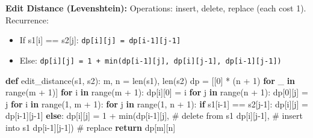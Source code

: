\documentclass[11pt]{article}
\providecommand{\tightlist}{\setlength{\itemsep}{1pt}\setlength{\parskip}{0pt}}
\newenvironment{Shaded}{\begin{snugshade}}{\end{snugshade}}
\newcommand{\BuiltInTok}[1]{\textcolor[rgb]{0.50,0.55,0.55}{#1}}
\newcommand{\CommentTok}[1]{\textcolor[rgb]{0.48,0.49,0.49}{#1}}
\newcommand{\ControlFlowTok}[1]{\textcolor[rgb]{0.99,0.74,0.29}{\textbf{#1}}}
\newcommand{\DecValTok}[1]{\textcolor[rgb]{0.96,0.45,0.00}{#1}}
\newcommand{\KeywordTok}[1]{\textcolor[rgb]{0.81,0.81,0.76}{\textbf{#1}}}
\newcommand{\NormalTok}[1]{\textcolor[rgb]{0.81,0.81,0.76}{#1}}
\newcommand{\OperatorTok}[1]{\textcolor[rgb]{0.81,0.81,0.76}{#1}}
\begin{document}
\textbf{Edit Distance (Levenshtein):}
Operations: insert, delete, replace (each cost 1).
Recurrence:

\begin{itemize}
\tightlist
\item
  If s1{[}i{]} == s2{[}j{]}: \texttt{dp{[}i{]}{[}j{]}\ =\ dp{[}i-1{]}{[}j-1{]}}
\item
  Else: \texttt{dp{[}i{]}{[}j{]}\ =\ 1\ +\ min(dp{[}i-1{]}{[}j{]},\ dp{[}i{]}{[}j-1{]},\ dp{[}i-1{]}{[}j-1{]})}
\end{itemize}


\begin{Shaded}
\begin{Highlighting}[]
\KeywordTok{def}\NormalTok{ edit\_distance(s1, s2):}
\NormalTok{    m, n }\OperatorTok{=} \BuiltInTok{len}\NormalTok{(s1), }\BuiltInTok{len}\NormalTok{(s2)}
\NormalTok{    dp }\OperatorTok{=}\NormalTok{ [[}\DecValTok{0}\NormalTok{] }\OperatorTok{*}\NormalTok{ (n }\OperatorTok{+} \DecValTok{1}\NormalTok{) }\ControlFlowTok{for}\NormalTok{ \_ }\KeywordTok{in} \BuiltInTok{range}\NormalTok{(m }\OperatorTok{+} \DecValTok{1}\NormalTok{)]}
    \ControlFlowTok{for}\NormalTok{ i }\KeywordTok{in} \BuiltInTok{range}\NormalTok{(m }\OperatorTok{+} \DecValTok{1}\NormalTok{): dp[i][}\DecValTok{0}\NormalTok{] }\OperatorTok{=}\NormalTok{ i}
    \ControlFlowTok{for}\NormalTok{ j }\KeywordTok{in} \BuiltInTok{range}\NormalTok{(n }\OperatorTok{+} \DecValTok{1}\NormalTok{): dp[}\DecValTok{0}\NormalTok{][j] }\OperatorTok{=}\NormalTok{ j}
    \ControlFlowTok{for}\NormalTok{ i }\KeywordTok{in} \BuiltInTok{range}\NormalTok{(}\DecValTok{1}\NormalTok{, m }\OperatorTok{+} \DecValTok{1}\NormalTok{):}
        \ControlFlowTok{for}\NormalTok{ j }\KeywordTok{in} \BuiltInTok{range}\NormalTok{(}\DecValTok{1}\NormalTok{, n }\OperatorTok{+} \DecValTok{1}\NormalTok{):}
            \ControlFlowTok{if}\NormalTok{ s1[i}\OperatorTok{{-}}\DecValTok{1}\NormalTok{] }\OperatorTok{==}\NormalTok{ s2[j}\OperatorTok{{-}}\DecValTok{1}\NormalTok{]:}
\NormalTok{                dp[i][j] }\OperatorTok{=}\NormalTok{ dp[i}\OperatorTok{{-}}\DecValTok{1}\NormalTok{][j}\OperatorTok{{-}}\DecValTok{1}\NormalTok{]}
            \ControlFlowTok{else}\NormalTok{:}
\NormalTok{                dp[i][j] }\OperatorTok{=} \DecValTok{1} \OperatorTok{+} \BuiltInTok{min}\NormalTok{(dp[i}\OperatorTok{{-}}\DecValTok{1}\NormalTok{][j],     }\CommentTok{\# delete from s1}
\NormalTok{                                   dp[i][j}\OperatorTok{{-}}\DecValTok{1}\NormalTok{],      }\CommentTok{\# insert into s1}
\NormalTok{                                   dp[i}\OperatorTok{{-}}\DecValTok{1}\NormalTok{][j}\OperatorTok{{-}}\DecValTok{1}\NormalTok{])    }\CommentTok{\# replace}
    \ControlFlowTok{return}\NormalTok{ dp[m][n]}
\end{Highlighting}
\end{Shaded}
\end{document}
